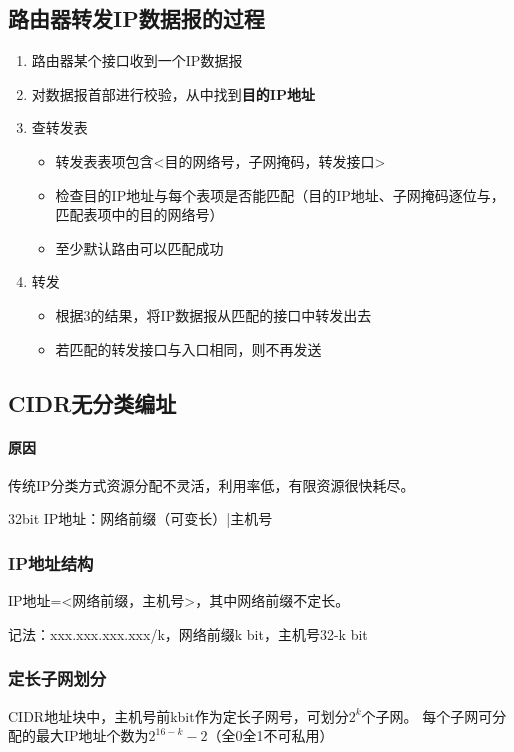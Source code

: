 \subsection{路由器转发IP数据报的过程}
\begin{enumerate}
    \item 路由器某个接口收到一个IP数据报
    \item 对数据报首部进行校验，从中找到\textbf{目的IP地址}
    \item 查转发表\begin{itemize}
        \item 转发表表项包含<目的网络号，子网掩码，转发接口>
        \item 检查目的IP地址与每个表项是否能匹配（目的IP地址、子网掩码逐位与，匹配表项中的目的网络号）
        \item 至少默认路由可以匹配成功
    \end{itemize}
    \item 转发\begin{itemize}
        \item 根据3的结果，将IP数据报从匹配的接口中转发出去
        \item 若匹配的转发接口与入口相同，则不再发送
    \end{itemize}
\end{enumerate}


\subsection{CIDR无分类编址}

\paragraph{原因}
传统IP分类方式资源分配不灵活，利用率低，有限资源很快耗尽。

32bit IP地址：网络前缀（可变长）|主机号


\subsubsection{IP地址结构}
IP地址=<网络前缀，主机号>，其中网络前缀不定长。

记法：xxx.xxx.xxx.xxx/k，网络前缀k bit，主机号32-k bit



\subsubsection{定长子网划分}
CIDR地址块中，主机号前kbit作为定长子网号，可划分\(2^k\)个子网。
每个子网可分配的最大IP地址个数为\(2^{16 - k} - 2\)（全0全1不可私用）


